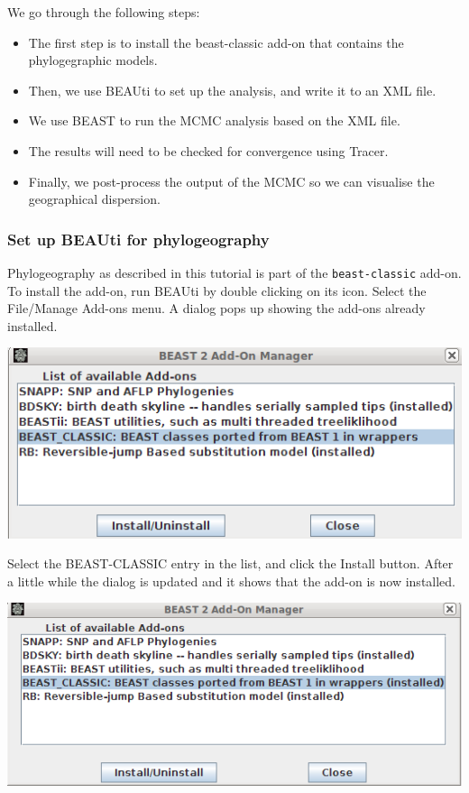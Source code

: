\documentclass{article}
\begin{document}
We go through the following steps:
\begin{itemize}
\item The first step is to install the beast-classic add-on that contains the phylogegraphic models. 
\item Then, we use BEAUti to set up the analysis, and write it to an XML file.
\item We use BEAST to run the MCMC analysis based on the XML file.
\item The results will need to be checked for convergence using Tracer.
\item Finally, we post-process the output of the MCMC so we can visualise the geographical dispersion.
\end{itemize}

\subsubsection*{Set up BEAUti for phylogeography}

Phylogeography as described in this tutorial is part of the {\tt beast-classic} add-on.
To install the add-on, run BEAUti by double clicking on its icon. 
Select the File/Manage Add-ons menu. A dialog pops up showing the add-ons already installed. 

\begin{center}
\includegraphics[scale=0.4]{figures/addonmgr.png}
\end{center}

Select the BEAST-CLASSIC entry in the list, and click the Install button. After a little while the dialog is updated and it shows that the add-on is now installed.

\begin{center}
\includegraphics[scale=0.4]{figures/addonmgr2.png}
\end{center}
\end{document}
